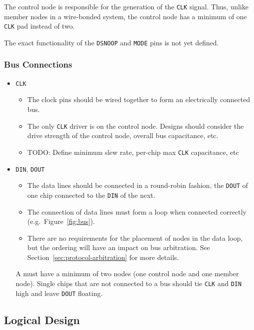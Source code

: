 The control node is responsible for the generation of the {\tt CLK} signal.
Thus, unlike member nodes in a wire-bonded system, the control node has a
minimum of one {\tt CLK} pad instead of two.

The exact functionality of the {\tt DSNOOP} and {\tt MODE} pins is not yet
defined.

\subsubsection{Bus Connections}
\label{sec:physical-bus}
\begin{itemize}
  \item {\tt CLK}
  \begin{itemize}
    \item The clock pins should be wired together to form an electrically
      connected bus.
    \item The only {\tt CLK} driver is on the control node. Designs should
      consider the drive strength of the control node, overall bus
      capacitance, etc.
    \item TODO: Define minimum slew rate, per-chip max {\tt CLK} capacitance,
      etc
  \end{itemize}
  \item {\tt DIN}, {\tt DOUT}
  \begin{itemize}
    \item The data lines should be connected in a round-robin fashion, the
      {\tt DOUT} of one chip connected to the {\tt DIN} of the next.
    \item The connection of data lines must form a loop when connected
      correctly (e.g.~Figure~\ref{fig:bus}).
    \item There are no requirements for the placement of nodes in the data
      loop, but the ordering will have an impact on bus arbitration. See
      Section~\ref{sec:protocol-arbitration} for more details.
  \end{itemize}
  A \bus must have a minimum of two nodes (one control node and one
  member node). Single chips that are not connected to a bus should tie
  {\tt CLK} and {\tt DIN} high and leave {\tt DOUT} floating.
\end{itemize}



\subsection{Logical Design}
\label{sec:logical}

